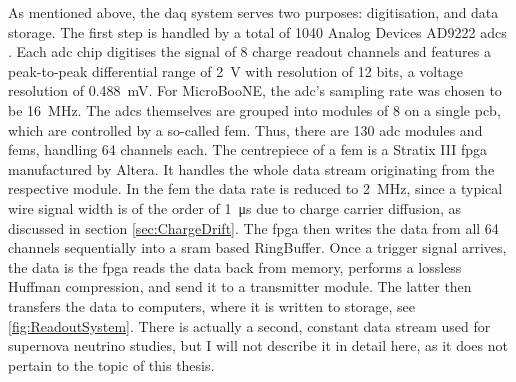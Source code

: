 As mentioned above, the \gls{daq} system serves two purposes: digitisation, and data storage. The first step is handled by a total of \num{1040} Analog Devices AD9222 \glspl{adc} \cite{ADCDataSheet}. Each \gls{adc} chip digitises the signal of \num{8} charge readout channels and features a peak-to-peak differential range of \SI{2}{\volt} with resolution of \num{12} bits, \ie a voltage resolution of \SI{0.488}{\milli\volt}. For MicroBooNE, the \gls{adc}'s sampling rate was chosen to be \SI{16}{\mega\hertz}. The \glspl{adc} themselves are grouped into modules of \num{8} on a single \gls{pcb}, which are controlled by a so-called \gls{fem}. Thus, there are \num{130} \gls{adc} modules and \glspl{fem}, handling \num{64} channels each. The centrepiece of a \gls{fem} is a Stratix III \gls{fpga} manufactured by Altera. It handles the whole data stream originating from the respective module. In the \gls{fem} the data rate is reduced to \SI{2}{\mega\hertz}, since a typical wire signal width is of the order of \SI{1}{\micro\second} due to charge carrier diffusion, as discussed in section \ref{sec:ChargeDrift}. The \gls{fpga} then writes the data from all \num{64} channels sequentially into a \gls{sram} based \gls{RingBuffer}. Once a trigger signal arrives, the data is the \gls{fpga} reads the data back from memory, performs a lossless Huffman compression, and send it to a transmitter module. The latter then transfers the data to computers, where it is written to storage, see \ref{fig:ReadoutSystem}. There is actually a second, constant data stream used for supernova neutrino studies, but I will not describe it in detail here, as it does not pertain to the topic of this thesis.

